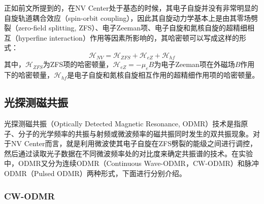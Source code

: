 \documentclass[type = bachelor, oneside]{whu-thesis}
\begin{document}
正如前文所提到的，在NV Center处于基态的时候，其电子自旋并没有非常明显的自旋轨道耦合效应（spin-orbit coupling），因此其自旋动力学基本上是由其零场劈裂（zero-field splitting, ZFS）、电子Zeeman项、电子自旋和氮核自旋的超精细相互（hyperfine interaction）作用等因素所影响的，其哈密顿可以写成这样的形式：
\begin{equation}
  \mathcal{H}_{NV} = \mathcal{H}_{ZFS}+\mathcal{H}_{eZ}+\mathcal{H}_{hf}
  \label{equ: NV Hamiltonian}
\end{equation}
其中，$\mathcal{H}_{ZFS}$为ZFS项的哈密顿量，$\mathcal{H}_{eZ}=-\mu_eB$为电子Zeeman项在外磁场$B$作用下的哈密顿量，$\mathcal{H}_{hf}$是电子自旋和氮核自旋相互作用的超精细作用项的哈密顿量。

\subsection{光探测磁共振}

光探测磁共振（Optically Detected Magnetic Resonance, ODMR）技术是指原子、分子的光学频率的共振与射频或微波频率的磁共振同时发生的双共振现象。对于NV Center而言，就是利用微波使其电子自旋在ZFS劈裂的能级之间进行调控，然后通过读取光子数据在不同微波频率处的对比度来确定共振谱的技术。在实验中，ODMR又分为连续ODMR（Continuous Wave-ODMR，CW-ODMR）和脉冲ODMR（Pulsed ODMR）两种形式，下面进行分别介绍。

\subsubsection{CW-ODMR}
\end{document}
